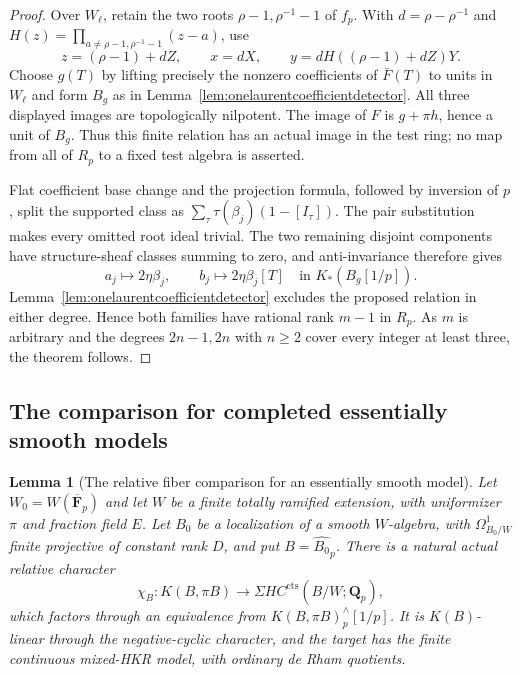 \documentclass[11pt,a4paper]{article}
\newtheorem{lemma}[theorem]{Lemma}
\theoremstyle{remark}
\begin{document}
\begin{proof}
Over $W_\ell$, retain the two roots
$\rho-1,\rho^{-1}-1$ of $f_p$.
With $d=\rho-\rho^{-1}$ and
$H(z)=\prod_{a\ne\rho-1,\rho^{-1}-1}(z-a)$, use
\[
 z=(\rho-1)+dZ,\qquad x=dX,\qquad
 y=dH((\rho-1)+dZ)Y.
\]
Choose $g(T)$ by lifting precisely the nonzero coefficients of
$\bar F(T)$ to units in $W_\ell$ and form $B_g$ as in
Lemma~\ref{lem:onelaurentcoefficientdetector}.
All three displayed images are topologically nilpotent.
The image of $F$ is $g+\pi h$, hence a unit of $B_g$.
Thus this finite relation has an actual image in the test ring;
no map from all of $R_p$ to a fixed test algebra is asserted.

Flat coefficient base change and the projection formula, followed
by inversion of $p$, split the supported class as
$\sum_\tau\tau(\beta_j)(1-[I_\tau])$.
The pair substitution makes every omitted root ideal trivial.
The two remaining disjoint components have structure-sheaf
classes summing to zero, and anti-invariance therefore gives
\[
 a_j\longmapsto2\eta\beta_j,\qquad
 b_j\longmapsto2\eta\beta_j[T]
 \quad\text{in }K_*(B_g[1/p]).
\]
Lemma~\ref{lem:onelaurentcoefficientdetector} excludes the proposed
relation in either degree.
Hence both families have rational rank $m-1$ in $R_p$.
As $m$ is arbitrary and the degrees $2n-1,2n$ with $n\geq2$
cover every integer at least three, the theorem follows.
\end{proof}


\subsection{The comparison for completed essentially smooth models}

\begin{lemma}[The relative fiber comparison for an essentially smooth model]
\label{lem:essentiallysmoothAMMN}
Let $W_0=W(\overline{\mathbf F}_p)$ and let $W$
be a finite totally ramified extension, with uniformizer $\pi$
and fraction field $E$. Let $B_0$ be a localization of a smooth
$W$-algebra, with $\Omega^1_{B_0/W}$ finite projective of constant
rank $D$, and put $B=\widehat{B_0}_p$.
There is a natural actual relative character
\[
 \chi_B:K(B,\pi B)\longrightarrow
                 \Sigma HC^{\mathrm{cts}}(B/W;\mathbf Q_p),
\]
which factors through an equivalence from
$K(B,\pi B)^{\wedge}_p[1/p]$. It is $K(B)$-linear through the negative-cyclic
character, and the target has the finite continuous mixed-HKR
model, with ordinary de Rham quotients.
\end{lemma}
\end{document}
